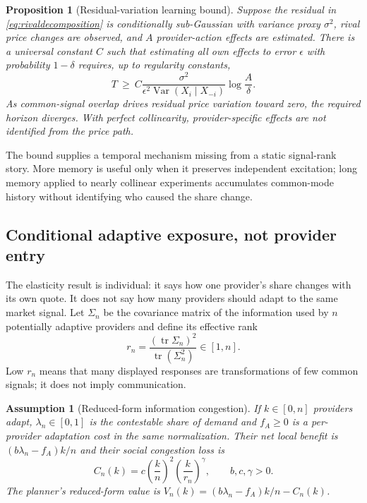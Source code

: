 \documentclass[sigconf,nonacm]{acmart}
\newtheorem{assumption}{Assumption}
\newtheorem{proposition}{Proposition}
\newcommand{\1}{\mathbf 1}
\begin{document}
\begin{proposition}[Residual-variation learning bound]
\label{prop:learning}
Suppose the residual in \eqref{eq:rivaldecomposition} is conditionally
sub-Gaussian with variance proxy $\sigma^2$, rival price changes are observed,
and $A$ provider-action effects are estimated.  There is a universal constant
$C$ such that estimating all own effects to error $\epsilon$ with probability
$1-\delta$ requires, up to regularity constants,
\begin{equation}
 T\ \ge\ C\frac{\sigma^2}{\epsilon^2
 \operatorname{Var}(X_i\mid X_{-i})}\log\frac{A}{\delta}.
 \label{eq:learningbound}
\end{equation}
As common-signal overlap drives residual price variation toward zero, the
required horizon diverges.  With perfect collinearity, provider-specific effects
are not identified from the price path.
\end{proposition}

The bound supplies a temporal mechanism missing from a static signal-rank
story.  More memory is useful only when it preserves independent excitation;
long memory applied to nearly collinear experiments accumulates common-mode
history without identifying who caused the share change.

\subsection{Conditional adaptive exposure, not provider entry}

The elasticity result is individual: it says how one provider's share changes
with its own quote.  It does not say how many providers should adapt to the same
market signal.  Let $\Sigma_n$ be the covariance matrix of the information used
by $n$ potentially adaptive providers and define its effective rank
\begin{equation}
r_n=\frac{(\operatorname{tr}\Sigma_n)^2}
{\operatorname{tr}(\Sigma_n^2)}\in[1,n].
\label{eq:effectiverank}
\end{equation}
Low $r_n$ means that many displayed responses are transformations of few common
signals; it does not imply communication.

\begin{assumption}[Reduced-form information congestion]
\label{ass:congestion}
If $k\in[0,n]$ providers adapt, $\lambda_n\in[0,1]$ is the contestable share of
demand and $f_A\ge0$ is a per-provider adaptation cost in the same normalization.
Their net local benefit is $(b\lambda_n-f_A)k/n$ and
their social congestion loss is
\begin{equation}
C_n(k)=c\left(\frac{k}{n}\right)^2
\left(\frac{k}{r_n}\right)^\gamma,
\qquad b,c,\gamma>0.
\label{eq:congestioncost}
\end{equation}
The planner's reduced-form value is
$V_n(k)=(b\lambda_n-f_A)k/n-C_n(k)$.
\end{assumption}
\end{document}
